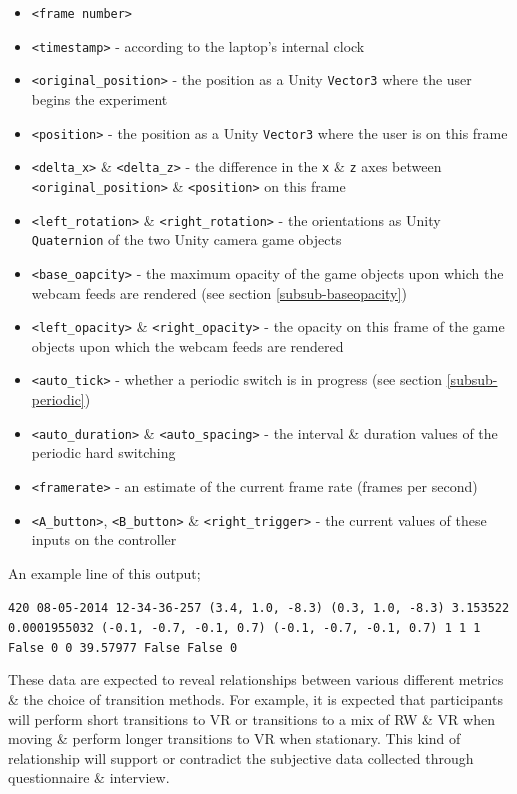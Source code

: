\begin{itemize}
	\item \texttt{<frame number>}
	\item \texttt{<timestamp>} - according to the laptop's internal clock
	\item \texttt{<original\_position>} - the position as a Unity \texttt{Vector3} where the user begins the experiment
	\item \texttt{<position>} - the position as a Unity \texttt{Vector3} where the user is on this frame
	\item \texttt{<delta\_x>} \& \texttt{<delta\_z>} - the difference in the \texttt{x} \& \texttt{z} axes between \texttt{<original\_position>} \& \texttt{<position>} on this frame
	\item \texttt{<left\_rotation>} \& \texttt{<right\_rotation>} - the orientations as Unity \texttt{Quaternion} of the two Unity camera game objects
	\item \texttt{<base\_oapcity>} - the maximum opacity of the game objects upon which the webcam feeds are rendered (see section \ref{subsub-baseopacity})
	\item \texttt{<left\_opacity>} \& \texttt{<right\_opacity>} - the opacity on this frame of the game objects upon which the webcam feeds are rendered
	\item \texttt{<auto\_tick>} - whether a periodic switch is in progress (see section \ref{subsub-periodic})
	\item \texttt{<auto\_duration>} \& \texttt{<auto\_spacing>} - the interval \& duration values of the periodic hard switching
	\item \texttt{<framerate>} - an estimate of the current frame rate (frames per second)
	\item \texttt{<A\_button>}, \texttt{<B\_button>} \& \texttt{<right\_trigger>} - the current values of these inputs on the controller
\end{itemize}

\vspace{4mm}

An example line of this output;

\begin{center}
	\texttt{420	08-05-2014 12-34-36-257	(3.4, 1.0, -8.3)	(0.3, 1.0, -8.3)	3.153522	0.0001955032	(-0.1, -0.7, -0.1, 0.7)	(-0.1, -0.7, -0.1, 0.7)	1	1	1	False	0	0	39.57977	False	False	0}
\end{center}

These data are expected to reveal relationships between various different metrics \& the choice of transition methods. For example, it is expected that participants will perform short transitions to VR or transitions to a mix of RW \& VR when moving \& perform longer transitions to VR when stationary. This kind of relationship will support or contradict the subjective data collected through questionnaire \& interview.

